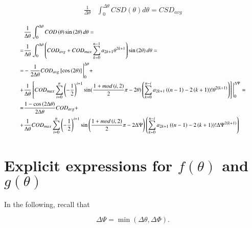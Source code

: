 \documentclass[review]{elsarticle}
\begin{document}
\begin{equation}
\begin{aligned}
\frac{1}{\Delta\theta}&\int_{0}^{\Delta\theta}CSD\left(\theta\right)d\theta=CSD_{avg}
\end{aligned}
\end{equation}

\begin{equation}
\footnotesize
\begin{aligned}
&\frac{1}{\Delta\theta}\int_{0}^{\Delta\theta}COD\left(\theta\right)\sin\left(2\theta\right)d\theta=\\
=&\frac{1}{\Delta\theta}\int_{0}^{\Delta\theta}\left(COD_{avg}+COD_{max}\sum_{k=0}^{n-1}a_{2k+1}\theta^{2k+1}\right)\sin\left(2\theta\right)d\theta=\\
=&-\frac{1}{2\Delta\theta}COD_{avg}\left[\cos\left(2\theta\right)\right]\Bigg\rvert_{0}^{\Delta\theta}+\\
+&\frac{1}{\Delta\theta}\left[COD_{max}\sum_{i=0}^{n}\left(-\frac{1}{2}\right)^{i+1}\sin(\frac{1+mod\left(i,2\right)}{2}\pi-2\theta)\left(\sum_{k=0}^{n-i}a_{2k+1}\left(\left(n-1\right)-2\left(k+1\right)\right)!\theta^{2\left(k+1\right)}\right)\right]\Bigg\rvert_{0}^{\Delta\Psi}=\\
=&\frac{1-\cos\left(2\Delta\theta\right)}{2\Delta\theta}COD_{avg}+\\
+&\frac{1}{\Delta\theta}COD_{max}\sum_{i=0}^{n}\left(-\frac{1}{2}\right)^{i+1}\sin\left(\frac{1+mod\left(i,2\right)}{2}\pi-2\Delta\Psi\right)\left(\sum_{k=0}^{n-i}a_{2k+1}\left(\left(n-1\right)-2\left(k+1\right)\right)!\Delta\Psi^{2\left(k+1\right)}\right)
\end{aligned}
\end{equation}



\appendix
\section{Explicit expressions for $f\left(\theta\right)$ and $g\left(\theta\right)$}\label{app:fandgexplicit}

In the following, recall that

\begin{equation}
\Delta\Psi=\min\left(\Delta\theta,\Delta\Phi\right).
\end{equation}
\end{document}
